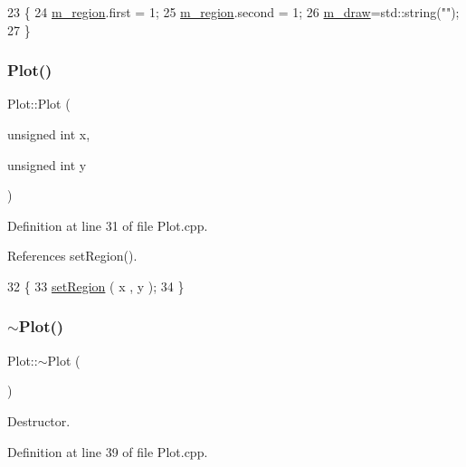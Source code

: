 \begin{DoxyCode}
23              \{
24   \hyperlink{classPlot_aabcbba1cfc66babcbcd647fdf90cdbf1}{m\_region}.first  = 1;
25   \hyperlink{classPlot_aabcbba1cfc66babcbcd647fdf90cdbf1}{m\_region}.second = 1;
26   \hyperlink{classPlot_a83ffbf3effe6a2f8befa6375882f3994}{m\_draw}=std::string(\textcolor{stringliteral}{""});
27 \}
\end{DoxyCode}
\mbox{\label{classPlot_a4e89bc6ea1800ba9697c9e0a0dc50a2e}} 
\subsubsection{\texorpdfstring{Plot()}{Plot()}\hspace{0.1cm}{\footnotesize\ttfamily [2/2]}}
{\footnotesize\ttfamily Plot\+::\+Plot (\begin{DoxyParamCaption}\item[{unsigned int}]{x,  }\item[{unsigned int}]{y }\end{DoxyParamCaption})}



Definition at line 31 of file Plot.\+cpp.



References set\+Region().


\begin{DoxyCode}
32                             \{
33   \hyperlink{classPlot_a77a015d72e98d6fb066481e9c70af1ec}{setRegion} ( x , y );
34 \}
\end{DoxyCode}
\mbox{\label{classPlot_a277e9c79c4357b3a317d74d61dabefcf}} 
\subsubsection{\texorpdfstring{$\sim$\+Plot()}{~Plot()}}
{\footnotesize\ttfamily Plot\+::$\sim$\+Plot (\begin{DoxyParamCaption}{ }\end{DoxyParamCaption})\hspace{0.3cm}{\ttfamily [virtual]}}



Destructor. 



Definition at line 39 of file Plot.\+cpp.


